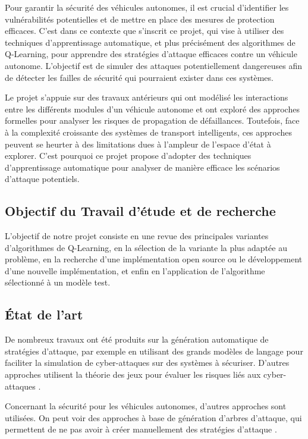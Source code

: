 \documentclass[a4paper]{article}
\begin{document}
    Pour garantir la sécurité des véhicules autonomes, il est crucial d'identifier les vulnérabilités potentielles et de mettre en place des mesures de protection efficaces. C'est dans ce contexte que s'inscrit ce projet, qui vise à utiliser des techniques d'apprentissage automatique, et plus précisément des algorithmes de Q-Learning, pour apprendre des stratégies d'attaque efficaces contre un véhicule autonome. L'objectif est de simuler des attaques potentiellement dangereuses afin de détecter les failles de sécurité qui pourraient exister dans ces systèmes.

    Le projet s'appuie sur des travaux antérieurs qui ont modélisé les interactions entre les différents modules d'un véhicule autonome et ont exploré des approches formelles pour analyser les risques de propagation de défaillances. Toutefois, face à la complexité croissante des systèmes de transport intelligents, ces approches peuvent se heurter à des limitations dues à l'ampleur de l'espace d'état à explorer. C'est pourquoi ce projet propose d'adopter des techniques d'apprentissage automatique pour analyser de manière efficace les scénarios d'attaque potentiels.

    \subsection{Objectif du Travail d'étude et de recherche}

    L'objectif de notre projet consiste en une revue des principales variantes d'algorithmes de Q-Learning, en la sélection de la variante la plus adaptée au problème, en la recherche d'une implémentation open source ou le développement d'une nouvelle implémentation, et enfin en l'application de l'algorithme sélectionné à un modèle test.

    \subsection{État de l'art}

    De nombreux travaux ont été produits sur la génération automatique de stratégies d'attaque, par exemple en utilisant des grands modèles de langage \cite{xu_autoattacker_2024} pour faciliter la simulation de cyber-attaques sur des systèmes à sécuriser.
    D'autres approches utilisent la théorie des jeux pour évaluer les risques liés aux cyber-attaques \cite{law_security_2015}.

    Concernant la sécurité pour les véhicules autonomes, d'autres approches sont utilisées.
    On peut voir des approches à base de génération d'arbres d'attaque, qui permettent de ne pas avoir à créer manuellement des stratégies d'attaque \cite{kern_model-based_2021} \cite{sowka_review_2023}.
\end{document}
